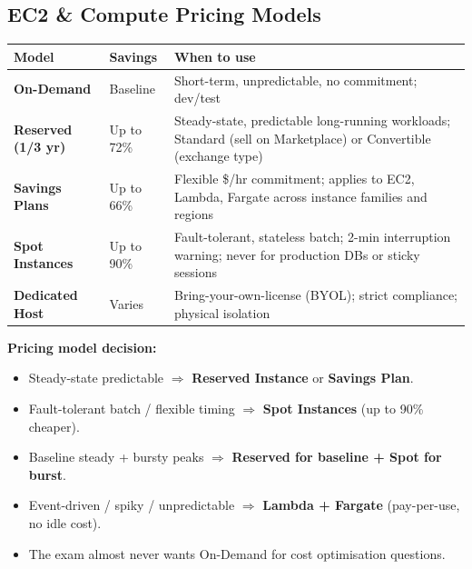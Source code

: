

\subsection{EC2 \& Compute Pricing Models}

\begin{comparebox}[title={Compute pricing model selection}]
\begin{tabular}{@{}p{3cm}p{2.5cm}p{6cm}@{}}
\toprule
\textbf{Model} & \textbf{Savings} & \textbf{When to use} \\
\midrule
\textbf{On-Demand}      & Baseline & Short-term, unpredictable, no commitment; dev/test \\[3pt]
\textbf{Reserved (1/3 yr)} & Up to 72\% & Steady-state, predictable long-running workloads;
                              Standard (sell on Marketplace) or Convertible (exchange type) \\[3pt]
\textbf{Savings Plans}  & Up to 66\% & Flexible \$/hr commitment; applies to EC2, Lambda, Fargate
                              across instance families and regions \\[3pt]
\textbf{Spot Instances} & Up to 90\% & Fault-tolerant, stateless batch; 2-min interruption warning;
                              never for production DBs or sticky sessions \\[3pt]
\textbf{Dedicated Host} & Varies     & Bring-your-own-license (BYOL); strict compliance; physical isolation \\
\bottomrule
\end{tabular}
\end{comparebox}

\begin{examtip}
\textbf{Pricing model decision:}
\begin{itemize}
  \item Steady-state predictable $\Rightarrow$ \textbf{Reserved Instance} or \textbf{Savings Plan}.
  \item Fault-tolerant batch / flexible timing $\Rightarrow$ \textbf{Spot Instances} (up to 90\% cheaper).
  \item Baseline steady + bursty peaks $\Rightarrow$ \textbf{Reserved for baseline + Spot for burst}.
  \item Event-driven / spiky / unpredictable $\Rightarrow$ \textbf{Lambda + Fargate} (pay-per-use, no idle cost).
  \item The exam almost never wants On-Demand for cost optimisation questions.
\end{itemize}
\end{examtip}

